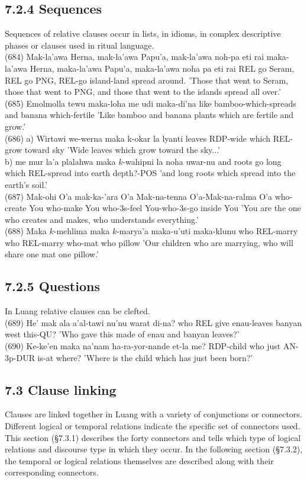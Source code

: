 \documentclass[10pt]{article}
\begin{document}
\subsection*{7.2.4 Sequences}
Sequences of relative clauses occur in lists, in idioms, in complex descriptive phases or clauses used in ritual language.\\
(684) Mak-la'awa Herna, mak-la'awa Papu'a, mak-la'awa noh-pa eti rai maka-la'awa Herna, maka-la'awa Papu'a, maka-la'awa noha pa eti rai REL go Seram, REL go PNG, REL-go island-land spread around. 'Those that went to Seram, those that went to PNG, and those that went to the islands spread all over.'\\
(685) Emolmolla tewu maka-loha me udi maka-di'na like bamboo-which-spreads and banana which-fertile 'Like bamboo and banana plants which are fertile and grow.'\\
(686) a) Wirtawi we-werna maka k-okar la lyanti leaves RDP-wide which REL-grow toward sky 'Wide leaves which grow toward the sky...'\\
b) me mur la'a plalahwa maka \(k\)-wahipni la noha uwar-nu and roots go long which REL-spread into earth depth?-POS 'and long roots which spread into the earth's soil.'\\
(687) Mak-ohi O'a mak-ka-'ara O'a Mak-na-tenna O'a-Mak-na-ralma O'a who-create You who-make You who-3s-feel You-who-3s-go inside You 'You are the one who creates and makes, who understands everything.'\\
(688) Maka \(k\)-mehlima maka \(k\)-marya'a maka-u'uti maka-klunu who REL-marry who REL-marry who-mat who pillow 'Our children who are marrying, who will share one mat one pillow.'

\subsection*{7.2.5 Questions}
In Luang relative clauses can be clefted.\\
(689) He' mak ala a'al-tawi nu'nu warat di-na? who REL give enau-leaves banyan west this-QU? 'Who gave this made of enau and banyan leaves?'\\
(690) Ke-ke'en maka na'nam ha-ra-yor-nande et-la me? RDP-child who just AN-3p-DUR is-at where? 'Where is the child which has just been born?'

\subsection*{7.3 Clause linking}
Clauses are linked together in Luang with a variety of conjunctions or connectors. Different logical or temporal relations indicate the specific set of connectors used. This section (§7.3.1) describes the forty connectors and tells which type of logical relations and discourse type in which they occur. In the following section (§7.3.2), the temporal or logical relations themselves are described along with their corresponding connectors.
\end{document}
